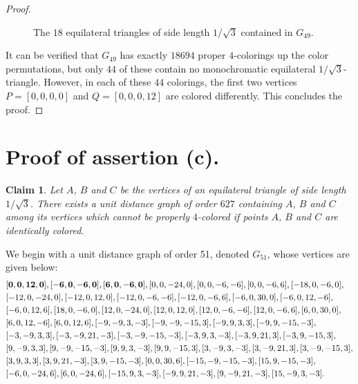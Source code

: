 \documentclass [11pt,oneside]{amsart}
\theoremstyle{definition}
\theoremstyle{plain}
\newtheorem{claim}[df]{Claim}
\begin{document}
\begin{proof}
\begin{figure}[ht]

\caption{The $18$ equilateral triangles of side length $1/\sqrt{3}$ contained in $G_{49}$. }
\label{equilateral}
\end{figure}

It can be verified that $G_{49}$ has exactly $18694$ proper $4$-colorings up the color permutations, but only $44$ of these contain no monochromatic equilateral $1/\sqrt{3}$-triangle.
However, in each of these $44$ colorings, the first two vertices $P=[0,0,0,0]$ and $Q=[0,0,0,12]$ are colored differently. This concludes the proof.

\end{proof}

\section{\bf Proof of assertion (c).}

\begin{claim}\label{Claim3}
Let $A$, $B$ and $C$ be the vertices of an equilateral triangle of side length $1/\sqrt{3}$. There exists a unit distance graph of order $627$ containing $A$, $B$ and $C$ among its vertices which cannot be properly $4$-colored if points $A$, $B$ and $C$ are identically colored.
\end{claim}
We begin with a unit distance graph of order 51, denoted $G_{51}$, whose vertices are given below:
{
\begin{align*}
& {\bf [0, 0, 12, 0], [-6, 0, -6, 0], [6, 0, -6, 0]}, [0, 0, -24, 0], [0, 0, -6, -6], [0, 0, -6, 6], [-18, 0, -6, 0],\\
& [-12, 0, -24, 0], [-12, 0, 12, 0], [-12, 0, -6, -6], [-12, 0, -6, 6], [-6, 0, 30, 0], [-6, 0, 12, -6],\\
& [-6, 0, 12, 6], [18, 0, -6, 0], [12, 0, -24, 0], [12, 0, 12, 0], [12, 0, -6, -6], [12, 0, -6, 6],  [6, 0, 30, 0],\\
& [6, 0, 12, -6], [6, 0, 12, 6], [-9, -9, 3, -3], [-9, -9, -15, 3], [-9, 9, 3, 3], [-9, 9, -15, -3], \\
& [-3, -9, 3, 3], [-3, -9, 21, -3], [-3, -9, -15, -3], [-3, 9, 3, -3], [-3, 9, 21, 3], [-3, 9, -15, 3], \\
& [9, -9, 3, 3], [9, -9, -15, -3], [9, 9, 3, -3], [9, 9, -15, 3], [3, -9, 3, -3], [3, -9, 21, 3], [3, -9, -15, 3], \\
& [3, 9, 3, 3], [3, 9, 21, -3],  [3, 9, -15, -3], [0, 0, 30, 6], [-15, -9, -15, -3], [15, 9, -15, -3], \\
&[-6, 0, -24, 6], [6, 0, -24, 6], [-15, 9, 3, -3], [-9, 9, 21, -3], [9, -9, 21, -3], [15, -9, 3, -3].
\end{align*}
}
\end{document}
